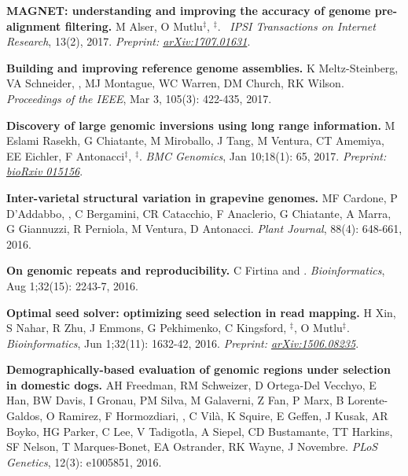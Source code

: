 \vspace{-.2cm}
    {\bf MAGNET: understanding and improving the accuracy of genome pre-alignment filtering.}
    M Alser, O Mutlu$^\ddag$, \calkan{}$^\ddag$. 
    {\em IPSI Transactions on Internet Research}, 13(2), 2017. \textit{Preprint: \href{https://doi.org/10.48550/arXiv.1707.01631}{arXiv:1707.01631}}.
     
\vspace{-.2cm}        
    {\bf Building and improving reference genome assemblies.} K Meltz-Steinberg, VA Schneider, \calkan{}, MJ Montague, WC Warren, DM Church, RK Wilson.
    {\em Proceedings of the IEEE}, Mar 3, 105(3): 422-435, 2017.

\vspace{-.2cm}
    {\bf Discovery of large genomic inversions using long range information.} M Eslami Rasekh, G Chiatante, M Miroballo, J Tang, M Ventura, CT Amemiya, EE Eichler, F Antonacci$^\ddag$, \calkan{}$^\ddag$.
    {\em BMC Genomics}, Jan 10;18(1): 65, 2017. \textit{Preprint: \href{https://doi.org/10.1101/015156}{bioRxiv 015156}}.
    
\vspace{-.2cm}        
    {\bf Inter-varietal structural variation in grapevine genomes.}
    MF Cardone, P D'Addabbo, \calkan{}, C Bergamini, CR Catacchio, F Anaclerio, G Chiatante, A Marra, G Giannuzzi, R Perniola, M Ventura, D Antonacci.
    {\em Plant Journal}, 88(4): 648-661, 2016.
    
\vspace{-.2cm}        
    {\bf On genomic repeats and reproducibility.}
    C Firtina and \calkan{}.
    {\em Bioinformatics}, Aug 1;32(15): 2243-7, 2016.

\vspace{-.2cm}
    {\bf Optimal seed solver: optimizing seed selection in read mapping.}
    H Xin, S Nahar, R Zhu, J Emmons, G Pekhimenko, C Kingsford, \calkan{}$^\ddag$, O Mutlu$^\ddag$.
    {\em Bioinformatics}, Jun 1;32(11): 1632-42, 2016. \textit{Preprint: \href{https://doi.org/10.48550/arXiv.1506.08235}{arXiv:1506.08235}}.

\vspace{-.2cm}        
    {\bf Demographically-based evaluation of genomic regions under selection in domestic dogs.}
    AH Freedman, RM Schweizer, D Ortega-Del Vecchyo, E Han, BW Davis, I Gronau, PM Silva, M Galaverni, Z Fan, P Marx, B Lorente-Galdos, O Ramirez, F Hormozdiari, \calkan{}, C Vilà, K Squire, E Geffen, J Kusak, AR Boyko, HG Parker, C Lee, V Tadigotla, A Siepel, CD Bustamante, TT Harkins, SF Nelson, T Marques-Bonet, EA Ostrander, RK Wayne, J Novembre.
    {\em PLoS Genetics}, 12(3): e1005851, 2016.

